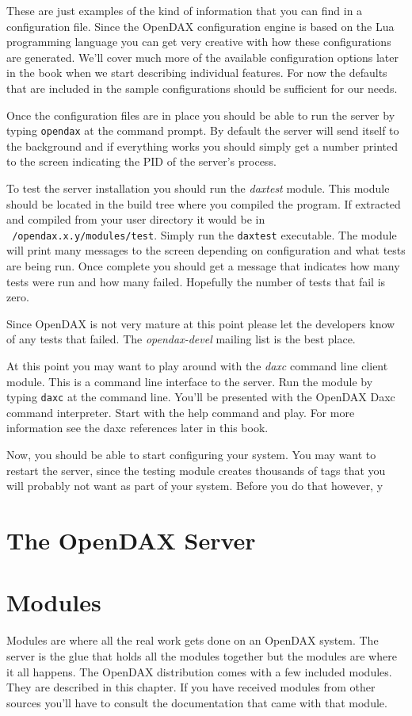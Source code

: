 These are just examples of the kind of information that you can find in a configuration file.  Since the OpenDAX configuration engine is based on the Lua programming language you can get very creative with how these configurations are generated.  We'll cover much more of the available configuration options later in the book when we start describing individual features.  For now the defaults that are included in the sample configurations should be sufficient for our needs.

Once the configuration files are in place you should be able to run the server by typing \texttt{opendax} at the command prompt.  By default the server will send itself to the background and if everything works you should simply get a number printed to the screen indicating the PID of the server's process.

To test the server installation you should run the \textit{daxtest} module.  This module should be located in the build tree where you compiled the program.  If extracted and compiled from your user directory it would be in \texttt{~/opendax.x.y/modules/test}.  Simply run the \texttt{daxtest} executable.  The module will print many messages to the screen depending on configuration and what tests are being run.  Once complete you should get a message that indicates how many tests were run and how many failed.  Hopefully the number of tests that fail is zero.

Since OpenDAX is not very mature at this point please let the developers know of any tests that failed.  The \textit{opendax-devel} mailing list is the best place.

At this point you may want to play around with the \textit{daxc} command line client module.  This is a command line interface to the server.  Run the module by typing \texttt{daxc} at the command line.  You'll be presented with the OpenDAX Daxc command interpreter.  Start with the help command and play.  For more information see the daxc references later in this book.

Now, you should be able to start configuring your system.  You may want to restart the server, since the testing module creates thousands of tags that you will probably not want as part of your system.  Before you do that however, y

\chapter{The OpenDAX Server}


\chapter{Modules}
Modules are where all the real work gets done on an OpenDAX system.  The server is the glue that holds all the modules together but the modules are where it all happens.  The OpenDAX distribution comes with a few included modules.  They are described in this chapter.  If you have received modules from other sources you'll have to consult the documentation that came with that module.

